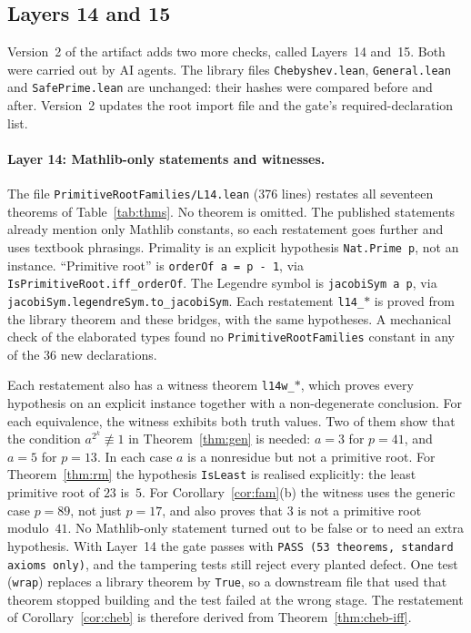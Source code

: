 \documentclass[11pt]{article}
\theoremstyle{remark}
\newcommand{\lean}[1]{\texttt{#1}}
\begin{document}
\subsection{Layers 14 and 15}\label{sec:l1415}
Version~2 of the artifact adds two more checks, called Layers~14 and~15. Both were carried out by AI
agents. The library files \lean{Chebyshev.lean}, \lean{General.lean} and \lean{SafePrime.lean} are
unchanged: their hashes were compared before and after. Version~2 updates the root import file
and the gate's required-declaration list.

\paragraph{Layer 14: Mathlib-only statements and witnesses.}
\begin{sloppypar}The file \lean{PrimitiveRootFamilies/L14.lean} (376 lines) restates all seventeen theorems of
Table~\ref{tab:thms}. No theorem is omitted. The published statements already mention only Mathlib
constants, so each restatement goes further and uses textbook phrasings. Primality is an explicit
hypothesis \lean{Nat.Prime p}, not an instance. ``Primitive root'' is \lean{orderOf a = p - 1}, via
\lean{IsPrimitiveRoot.iff\_orderOf}. The Legendre symbol is \lean{jacobiSym a p}, via
\lean{jacobiSym.legendreSym.to\_jacobiSym}. Each restatement \lean{l14\_$\ast$} is proved from the
library theorem and these bridges, with the same hypotheses. A mechanical check of the elaborated
types found no \lean{PrimitiveRootFamilies} constant in any of the 36 new declarations.\end{sloppypar}

Each restatement also has a witness theorem \lean{l14w\_$\ast$}, which proves every hypothesis on an
explicit instance together with a non-degenerate conclusion. For each equivalence, the witness
exhibits both truth values. Two of them show that the condition $a^{2^k}\not\equiv1$ in
Theorem~\ref{thm:gen} is needed: $a=3$ for $p=41$, and $a=5$ for $p=13$. In each case $a$ is a
nonresidue but not a primitive root. For Theorem~\ref{thm:rm} the hypothesis \lean{IsLeast} is
realised explicitly: the least primitive root of $23$ is~$5$. For Corollary~\ref{cor:fam}(b) the
witness uses the generic case $p=89$, not just $p=17$, and also proves that $3$ is not a primitive
root modulo~$41$. No Mathlib-only statement turned out to be false or to need an extra hypothesis.
With Layer~14 the gate passes with \texttt{PASS (53 theorems, standard axioms only)}, and the
tampering tests still reject every planted defect. One test (\texttt{wrap}) replaces a library
theorem by \lean{True}, so a downstream file that used that theorem stopped building and the test
failed at the wrong stage. The restatement of Corollary~\ref{cor:cheb} is therefore derived from
Theorem~\ref{thm:cheb-iff}.
\end{document}
